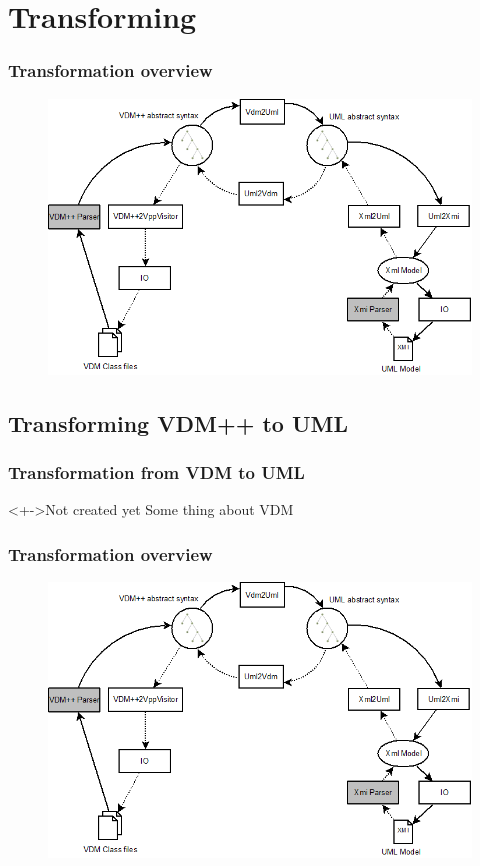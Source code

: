 
\section{Transforming}
%
%
\frame
{
  \frametitle{Transformation overview}

\begin{center}
\begin{figure}
\includegraphics[width=\textwidth]{images/OverviewOverMapping.png}
\end{figure}
\end{center}
}
\subsection{Transforming VDM++ to UML}

%
%
\frame
{
  \frametitle{Transformation from VDM to UML}

\begin{center}
	\begin{block}<+->{Not created yet}
	Some thing about VDM
	\end{block}

\end{center}
}


%
%
\frame
{
  \frametitle{Transformation overview}
\begin{center}
\begin{figure}

\includegraphics<1->[width=\textwidth]{images/OverviewOverMapping.png}%
%
%
%
%

\end{figure}
\end{center}
}



